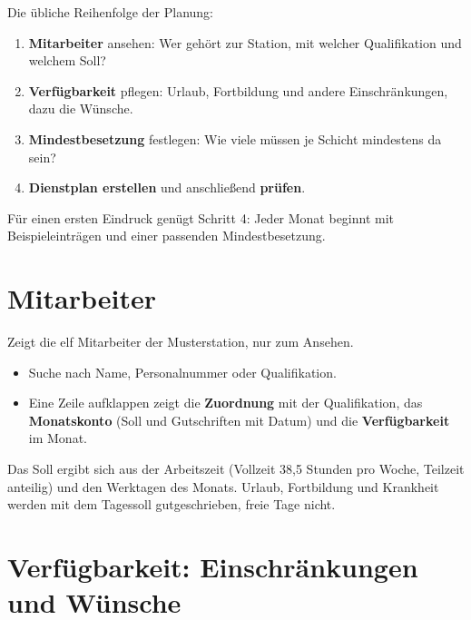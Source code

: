 \documentclass[11pt]{combiArticle}
\begin{document}
Die übliche Reihenfolge der Planung:
\begin{enumerate}
  \item \textbf{Mitarbeiter} ansehen: Wer gehört zur Station, mit welcher Qualifikation und welchem Soll?
  \item \textbf{Verfügbarkeit} pflegen: Urlaub, Fortbildung und andere Einschränkungen, dazu die Wünsche.
  \item \textbf{Mindestbesetzung} festlegen: Wie viele müssen je Schicht mindestens da sein?
  \item \textbf{Dienstplan erstellen} und anschließend \textbf{prüfen}.
\end{enumerate}
Für einen ersten Eindruck genügt Schritt 4: Jeder Monat beginnt mit Beispieleinträgen und einer passenden
Mindestbesetzung.

\section{Mitarbeiter}

Zeigt die elf Mitarbeiter der Musterstation, nur zum Ansehen.
\begin{itemize}
  \item Suche nach Name, Personalnummer oder Qualifikation.
  \item Eine Zeile aufklappen zeigt die \textbf{Zuordnung} mit der Qualifikation, das \textbf{Monatskonto}
        (Soll und Gutschriften mit Datum) und die \textbf{Verfügbarkeit} im Monat.
\end{itemize}
Das Soll ergibt sich aus der Arbeitszeit (Vollzeit 38,5 Stunden pro Woche, Teilzeit anteilig) und den Werktagen
des Monats. Urlaub, Fortbildung und Krankheit werden mit dem Tagessoll gutgeschrieben, freie Tage nicht.

\section{Verfügbarkeit: Einschränkungen und Wünsche}
\end{document}
